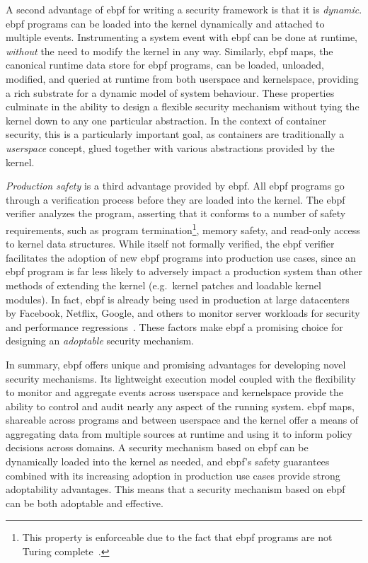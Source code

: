 \documentclass[
  fontsize=12pt,
  titlepage=firstiscover,
  paper=letter,
oneside,
  cleardoublepage=plain,
  parskip=half-,
  DIV=10,
  parindent,
  appendixprefix,
  chapterprefix,
  listof=totoc,
]{scrbook}
\begin{document}
A second advantage of \gls{ebpf} for writing a security framework is that it is
\textit{dynamic}. \gls{ebpf} programs can be loaded into the kernel dynamically and attached to
multiple events. Instrumenting a system event with \gls{ebpf} can be done at runtime,
\textit{without} the need to modify the kernel in any way.  Similarly, \gls{ebpf} maps, the
canonical runtime data store for \gls{ebpf} programs, can be loaded, unloaded, modified, and
queried at runtime from both userspace and kernelspace, providing a rich substrate for
a dynamic model of system behaviour. These properties culminate in the ability to design
a flexible security mechanism without tying the kernel down to any one particular
abstraction. In the context of container security, this is a particularly important goal,
as containers are traditionally a \textit{userspace} concept, glued together with various
abstractions provided by the kernel.

\textit{Production safety} is a third advantage provided by \gls{ebpf}. All \gls{ebpf} programs go
through a verification process before they are loaded into the kernel. The \gls{ebpf} verifier
analyzes the program, asserting that it conforms to a number of safety requirements, such
as program termination\footnote{This property is enforceable due to the fact that \gls{ebpf}
programs are not Turing complete~\cite{gregg2019_bpf}.}, memory safety, and read-only
access to kernel data structures. While itself not formally verified, the \gls{ebpf} verifier
facilitates the adoption of new \gls{ebpf} programs into production use cases, since an \gls{ebpf}
program is far less likely to adversely impact a production system than other methods of
extending the kernel (e.g.\ kernel patches and loadable kernel modules). In fact, \gls{ebpf} is
already being used in production at large datacenters by Facebook, Netflix, Google, and
others to monitor server workloads for security and performance
regressions~\cite{gregg2019_bpf}. These factors make \gls{ebpf} a promising choice for
designing an \textit{adoptable} security mechanism.

In summary, \gls{ebpf} offers unique and promising advantages for developing novel security
mechanisms. Its lightweight execution model coupled with the flexibility to monitor and
aggregate events across userspace and kernelspace provide the ability to control and audit
nearly any aspect of the running system. \gls{ebpf} maps, shareable across programs and between
userspace and the kernel offer a means of aggregating data from multiple sources at
runtime and using it to inform policy decisions across domains. A security mechanism based
on \gls{ebpf} can be dynamically loaded into the kernel as needed, and \gls{ebpf}'s safety guarantees
combined with its increasing adoption in production use cases provide strong adoptability
advantages. This means that a security mechanism based on \gls{ebpf} can be both adoptable and
effective.
\end{document}
